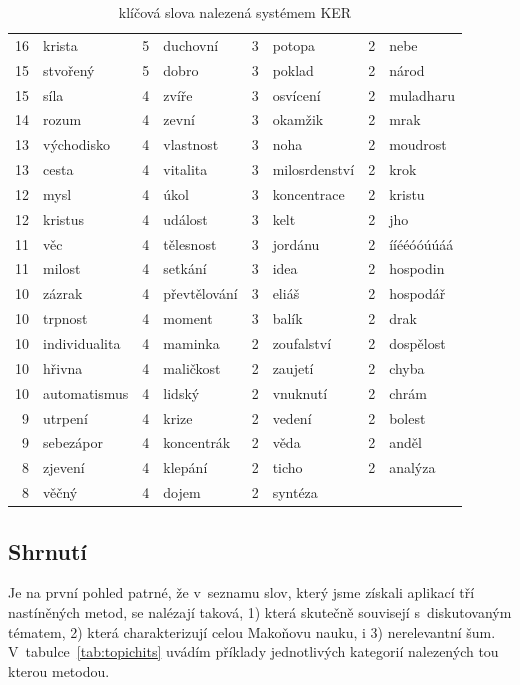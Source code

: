 \begin{table}[htpb]
\begin{center}
\begin{tabular}{|r l|r l|r l|r l|}
16 & krista	 & 5 & duchovní	 & 3 & potopa	 & 2 & nebe	 \\
15 & stvořený	 & 5 & dobro	 & 3 & poklad	 & 2 & národ	 \\
15 & síla	 & 4 & zvíře	 & 3 & osvícení	 & 2 & muladharu	 \\
14 & rozum	 & 4 & zevní	 & 3 & okamžik	 & 2 & mrak	 \\
13 & východisko	 & 4 & vlastnost	 & 3 & noha	 & 2 & moudrost	 \\
13 & cesta	 & 4 & vitalita	 & 3 & milosrdenství	 & 2 & krok	 \\
12 & mysl	 & 4 & úkol	 & 3 & koncentrace	 & 2 & kristu	 \\
12 & kristus	 & 4 & událost	 & 3 & kelt	 & 2 & jho	 \\
11 & věc	 & 4 & tělesnost	 & 3 & jordánu	 & 2 & ííééóóúúáá	 \\
11 & milost	 & 4 & setkání	 & 3 & idea	 & 2 & hospodin	 \\
10 & zázrak	 & 4 & převtělování	 & 3 & eliáš	 & 2 & hospodář	 \\
10 & trpnost	 & 4 & moment	 & 3 & balík	 & 2 & drak	 \\
10 & individualita	 & 4 & maminka	 & 2 & zoufalství	 & 2 & dospělost	 \\
10 & hřivna	 & 4 & maličkost	 & 2 & zaujetí	 & 2 & chyba	 \\
10 & automatismus	 & 4 & lidský	 & 2 & vnuknutí	 & 2 & chrám	 \\
9 & utrpení	 & 4 & krize	 & 2 & vedení	 & 2 & bolest	 \\
9 & sebezápor	 & 4 & koncentrák	 & 2 & věda	 & 2 & anděl	 \\
8 & zjevení	 & 4 & klepání	 & 2 & ticho	 & 2 & analýza	 \\
8 & věčný	 & 4 & dojem	 & 2 & syntéza	 &   &                  \\
\hline
\end{tabular}
\caption{klíčová slova nalezená systémem KER}\label{tab:ker}
\end{center}
\end{table}

\subsection{Shrnutí}

Je na první pohled patrné, že v~seznamu slov, který jsme získali aplikací tří
nastíněných metod, se nalézají taková, 1) která skutečně souvisejí s~diskutovaným
tématem, 2) která charakterizují celou Makoňovu nauku, i 3) nerelevantní šum.
V~tabulce~\ref{tab:topichits} uvádím příklady jednotlivých kategorií nalezených
tou kterou metodou.

